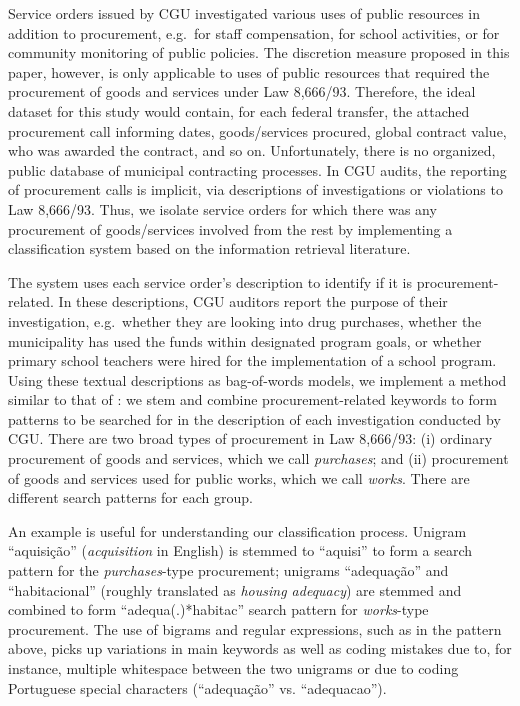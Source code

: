 \documentclass[11pt]{article}
\begin{document}
Service orders issued by CGU investigated various uses of public resources in addition to procurement, e.g.~for staff compensation, for school activities, or for community monitoring of public policies. The discretion measure proposed in this paper, however, is only applicable to uses of public resources that required the procurement of goods and services under Law 8,666/93. Therefore, the ideal dataset for this study would contain, for each federal transfer, the attached procurement call informing dates, goods/services procured, global contract value, who was awarded the contract, and so on. Unfortunately, there is no organized, public database of municipal contracting processes. In CGU audits, the reporting of procurement calls is implicit, via descriptions of investigations or violations to Law 8,666/93. Thus, we isolate service orders for which there was any procurement of goods/services involved from the rest by implementing a classification system based on the information retrieval literature.

The system uses each service order's description to identify if it is procurement-related. In these descriptions, CGU auditors report the purpose of their investigation, e.g.~whether they are looking into drug purchases, whether the municipality has used the funds within designated program goals, or whether primary school teachers were hired for the implementation of a school program. Using these textual descriptions as bag-of-words models, we implement a method similar to that of \citet{HopkinsMethodAutomatedNonparametric2009}: we stem and combine procurement-related keywords to form patterns to be searched for in the description of each investigation conducted by CGU. There are two broad types of procurement in Law 8,666/93: (i) ordinary procurement of goods and services, which we call \emph{purchases}; and (ii) procurement of goods and services used for public works, which we call \emph{works}. There are different search patterns for each group.

An example is useful for understanding our classification process. Unigram ``aquisição'' (\emph{acquisition} in English) is stemmed to ``aquisi'' to form a search pattern for the \emph{purchases}-type procurement; unigrams ``adequação'' and ``habitacional'' (roughly translated as \emph{housing adequacy}) are stemmed and combined to form ``adequa(.)*habitac'' search pattern for \emph{works}-type procurement. The use of bigrams and regular expressions, such as in the pattern above, picks up variations in main keywords as well as coding mistakes due to, for instance, multiple whitespace between the two unigrams or due to coding Portuguese special characters (``adequação'' vs. ``adequacao'').
\end{document}
